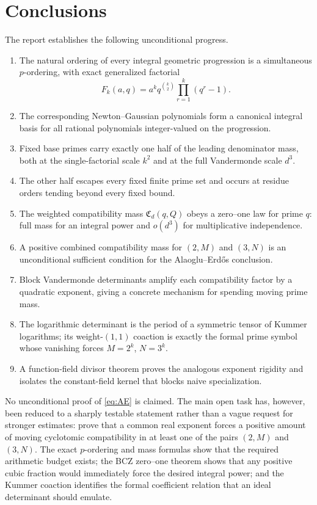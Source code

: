 \documentclass[11pt]{article}
\theoremstyle{definition}
\theoremstyle{remark}
\newcommand{\AEname}{Alaoglu--Erd\H{o}s}
\begin{document}
\section{Conclusions}

The report establishes the following unconditional progress.
\begin{enumerate}
 \item The natural ordering of every integral geometric progression is a
       simultaneous $p$-ordering, with exact generalized factorial
       \[
       F_k(a,q)=a^kq^{\binom{k}{2}}\prod_{r=1}^k(q^r-1).
       \]
 \item The corresponding Newton--Gaussian polynomials form a canonical
       integral basis for all rational polynomials integer-valued on the
       progression.
 \item Fixed base primes carry exactly one half of the leading denominator
       mass, both at the single-factorial scale $k^2$ and at the full
       Vandermonde scale $d^3$.
 \item The other half escapes every fixed finite prime set and occurs at
       residue orders tending beyond every fixed bound.
 \item The weighted compatibility mass
       $\mathfrak C_d(q,Q)$ obeys a zero--one law for prime $q$: full mass for
       an integral power and $o(d^3)$ for multiplicative independence.
 \item A positive combined compatibility mass for $(2,M)$ and $(3,N)$ is an
       unconditional sufficient condition for the \AEname{} conclusion.
 \item Block Vandermonde determinants amplify each compatibility factor by a
       quadratic exponent, giving a concrete mechanism for spending moving
       prime mass.
 \item The logarithmic determinant is the period of a symmetric tensor of
       Kummer logarithms; its weight-$(1,1)$ coaction is exactly the formal
       prime symbol whose vanishing forces $M=2^k$, $N=3^k$.
 \item A function-field divisor theorem proves the analogous exponent
       rigidity and isolates the constant-field kernel that blocks naive
       specialization.
\end{enumerate}

No unconditional proof of \eqref{eq:AE} is claimed.  The main open task has,
however, been reduced to a sharply testable statement rather than a vague
request for stronger estimates: prove that a common real exponent forces a
positive amount of moving cyclotomic compatibility in at least one of the
pairs $(2,M)$ and $(3,N)$.  The exact $p$-ordering and mass formulas show that
the required arithmetic budget exists; the BCZ zero--one theorem shows that
any positive cubic fraction would immediately force the desired integral
power; and the Kummer coaction identifies the formal coefficient relation
that an ideal determinant should emulate.
\end{document}
